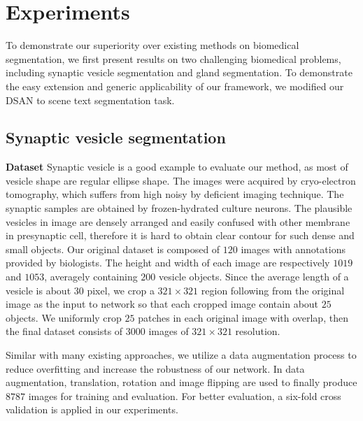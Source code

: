 \section{Experiments}
\label{sec:results}
To demonstrate our superiority over existing methods on biomedical segmentation, we first present results on two challenging biomedical problems, including synaptic vesicle segmentation and gland segmentation.
To demonstrate the easy extension and generic applicability of our framework, we modified our DSAN to scene text segmentation task.

\subsection{Synaptic vesicle segmentation}
\noindent\textbf{Dataset}
Synaptic vesicle is a good example to evaluate our method, as most of vesicle shape are regular ellipse shape.
The images were acquired by cryo-electron tomography, which suffers from high noisy by deficient imaging technique.
The synaptic samples are obtained by frozen-hydrated culture neurons.
The plausible vesicles in image are densely arranged and easily confused with other membrane in presynaptic cell, therefore it is hard to obtain clear contour for such dense and small objects.
Our original dataset is composed of $120$ images with annotations provided by biologists.
The height and width of each image are respectively $1019$ and $1053$, averagely containing $200$ vesicle objects.
Since the average length of a vesicle is about $30$ pixel, we crop a $321\times 321$ region following \cite{Chen2014a} from the original image as the input to network so that each cropped image contain about $25$ objects.
We uniformly crop $25$ patches in each original image with overlap, then the final dataset consists of $3000$ images of $321\times 321$ resolution.

Similar with many existing approaches, we utilize a data augmentation process to reduce overfitting and increase the robustness of our network.
In data augmentation, translation, rotation and image flipping are used to finally produce $8787$ images for training and evaluation.
For better evaluation, a six-fold cross validation is applied in our experiments.

